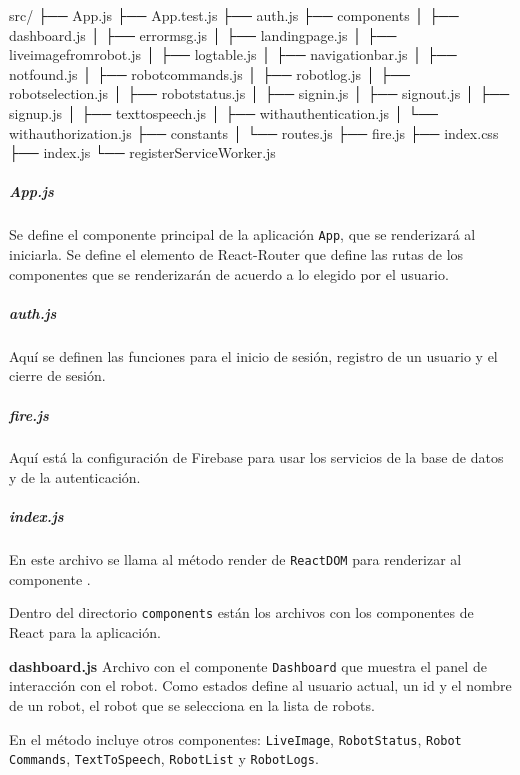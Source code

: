 %
\begin{sphinxVerbatim}[commandchars=\\\{\}]
src/
├── App.js
├── App.test.js
├── auth.js
├── components
│   ├── dashboard.js
│   ├── error\PYGZus{}msg.js
│   ├── landing\PYGZus{}page.js
│   ├── live\PYGZus{}image\PYGZus{}from\PYGZus{}robot.js
│   ├── log\PYGZus{}table.js
│   ├── navigation\PYGZus{}bar.js
│   ├── not\PYGZus{}found.js
│   ├── robot\PYGZus{}commands.js
│   ├── robot\PYGZus{}log.js
│   ├── robot\PYGZus{}selection.js
│   ├── robot\PYGZus{}status.js
│   ├── signin.js
│   ├── signout.js
│   ├── signup.js
│   ├── text\PYGZus{}to\PYGZus{}speech.js
│   ├── with\PYGZus{}authentication.js
│   └── with\PYGZus{}authorization.js
├── constants
│   └── routes.js
├── fire.js
├── index.css
├── index.js
└── registerServiceWorker.js
\end{sphinxVerbatim}


\subparagraph{App.js}
\label{\detokenize{code_docs:app-js}}
Se define el componente principal de la aplicación \texttt{App}, que se renderizará
al iniciarla. Se define el elemento  de React-Router
que define las rutas de los componentes que se renderizarán de acuerdo a lo
elegido por el usuario.


\subparagraph{auth.js}
\label{\detokenize{code_docs:auth-js}}
Aquí se definen las funciones para el inicio de sesión, registro de un usuario
y el cierre de sesión.


\subparagraph{fire.js}
\label{\detokenize{code_docs:fire-js}}
Aquí está la configuración de Firebase para usar los servicios de la base de datos
y de la autenticación.



\subparagraph{index.js}
\label{\detokenize{code_docs:index-js}}
En este archivo se llama al método render de \texttt{ReactDOM} para renderizar al
componente .


Dentro del directorio \texttt{components} están los archivos con los componentes de React para la aplicación.

\textbf{dashboard.js}
\label{\detokenize{code_docs:dashboard-js}}
Archivo con el componente \texttt{Dashboard} que muestra el panel de interacción con el robot.
Como estados define al usuario actual, un id y el nombre de un robot, el robot
que se selecciona en la lista de robots.

En el método  incluye otros componentes:
\texttt{LiveImage},
\texttt{RobotStatus},
\texttt{Robot\\Commands},
\texttt{TextToSpeech},
\texttt{RobotList} y
\texttt{RobotLogs}.


